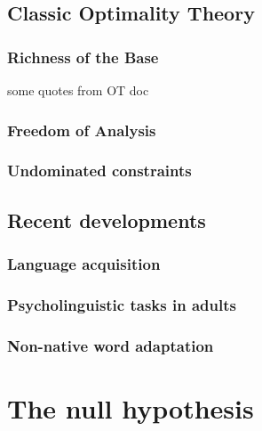 {\subsection{Classic Optimality Theory}


\subsubsection{Richness of the Base}

some quotes from OT doc
\citet{PE}
\citet{Bye2001}

\subsubsection{Freedom of Analysis}

\citet{Smolensky1996}
\citet{PE}

\subsubsection{Undominated constraints}


\subsection{Recent developments}

\subsubsection{Language acquisition}

\subsubsection{Psycholinguistic tasks in adults}


\subsubsection{Non-native word adaptation}


\section{The null hypothesis}

}
